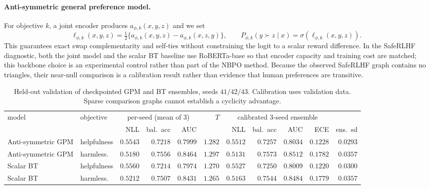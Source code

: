 \documentclass{article}
\theoremstyle{remark}
\theoremstyle{plain}
\begin{document}
\paragraph{Anti-symmetric general preference model.}
For objective $k$, a joint encoder produces $a_{\phi,k}(x,y,z)$ and we set
\[
\ell_{\phi,k}(x,y,z)
=\tfrac12\{a_{\phi,k}(x,y,z)-a_{\phi,k}(x,z,y)\},
\qquad
P_{\phi,k}(y\succ z\mid x)=\sigma(\ell_{\phi,k}(x,y,z)).
\]
This guarantees exact swap complementarity and self-ties without constraining the logit to a scalar reward difference. In the SafeRLHF diagnostic, both the joint model and the scalar BT baseline use RoBERTa-base so that encoder capacity and training cost are matched; this backbone choice is an experimental control rather than part of the NBPO method. Because the observed SafeRLHF graph contains no triangles, their near-null comparison is a calibration result rather than evidence that human preferences are transitive.

\begin{table}[t]
\centering\scriptsize
\setlength{\tabcolsep}{2.7pt}
\caption{Held-out validation of checkpointed GPM and BT ensembles, seeds $41/42/43$. Calibration uses validation data. Sparse comparison graphs cannot establish a cyclicity advantage.}
\label{tab:gpm-bt}
\begin{tabular}{llrrrrrrrrr}
\toprule
model & objective & \multicolumn{3}{c}{per-seed (mean of 3)} & $T$ & \multicolumn{4}{c}{calibrated 3-seed ensemble} \\
\cmidrule(lr){3-5}\cmidrule(lr){7-10}
 & & NLL & bal.\ acc & AUC & & NLL & bal.\ acc & AUC & ECE & ens.\ sd\\
\midrule
Anti-symmetric GPM & helpfulness & $0.5543$ & $0.7218$ & $0.7999$ & $1.282$ & $0.5512$ & $0.7257$ & $0.8034$ & $0.1228$ & $0.0293$\\
Anti-symmetric GPM & harmless. & $0.5180$ & $0.7556$ & $0.8464$ & $1.297$ & $0.5131$ & $0.7573$ & $0.8512$ & $0.1782$ & $0.0357$\\
Scalar BT & helpfulness & $0.5560$ & $0.7214$ & $0.7974$ & $1.270$ & $0.5527$ & $0.7250$ & $0.8009$ & $0.1220$ & $0.0300$\\
Scalar BT & harmless. & $0.5212$ & $0.7507$ & $0.8431$ & $1.265$ & $0.5163$ & $0.7544$ & $0.8484$ & $0.1779$ & $0.0357$\\
\bottomrule
\end{tabular}
\end{table}
\end{document}
